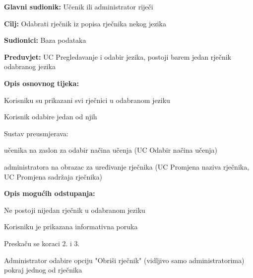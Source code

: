 \noindent {}
\begin{packed_item}

	\item \textbf{Glavni sudionik: } Učenik ili administrator riječi
	\item \textbf{Cilj: } Odabrati rječnik iz popisa rječnika nekog jezika
	\item \textbf{Sudionici: } Baza podataka
	\item \textbf{Preduvjet: } UC Pregledavanje i odabir jezika, postoji barem jedan rječnik odabranog jezika
	\item  \textbf{Opis osnovnog tijeka:}
	
	\item[] \begin{packed_enum}
		
		\item Korisniku su prikazani svi rječnici u odabranom jeziku
		\item Korisnik odabire jedan od njih
		\item Sustav preusmjerava:
		\item[] \begin{packed_item}
		
			\item učenika na zaslon za odabir načina učenja (UC Odabir načina učenja)
			\item administratora na obrazac za uređivanje rječnika (UC Promjena naziva rječnika, UC Promjena sadržaja rječnika)
			
		\end{packed_item}

	\end{packed_enum}

	\item  \textbf{Opis mogućih odstupanja:}
	
	\item[] \begin{packed_item}

		\item[1.a] Ne postoji nijedan rječnik u odabranom jeziku
		\item[] \begin{packed_enum}
			
			\item Korisniku je prikazana informativna poruka
			\item Preskaču se koraci 2. i 3.
			
		\end{packed_enum}
		\item[2.a] Administrator odabire opciju "Obriši rječnik" (vidljivo samo administratorima) pokraj jednog od rječnika
		\item[] \begin{packed_enum}
			

\end{packed_enum}
\end{packed_item}
\end{packed_item}
